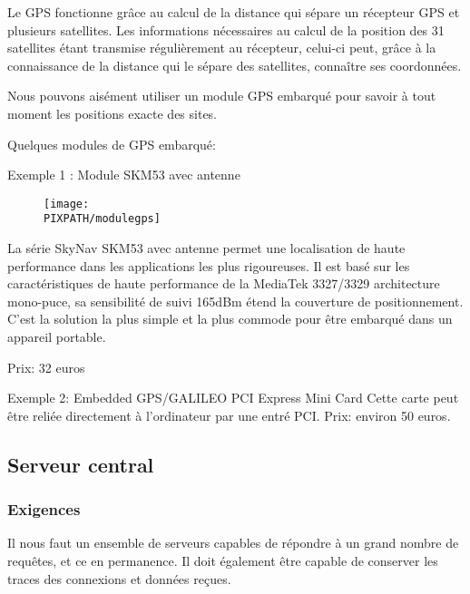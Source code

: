 Le GPS fonctionne grâce au calcul de la distance qui sépare un récepteur GPS et plusieurs satellites. Les informations nécessaires au calcul de la position des 31 satellites étant transmise régulièrement au récepteur, celui-ci peut, grâce à la connaissance de la distance qui le sépare des satellites, connaître ses coordonnées.

Nous pouvons aisément utiliser un module GPS embarqué pour savoir à tout moment les positions exacte des sites.

Quelques modules de GPS embarqué:
\begin{description}
\item Exemple 1 : Module SKM53 avec antenne

    \begin{figure}[!h]
    \begin{center}
    \texttt{[image: \\PIXPATH/modulegps]}
    \caption{}
    \end{center}
    \end{figure}
La série SkyNav SKM53 avec antenne permet une localisation de haute performance dans les applications les plus rigoureuses.
Il est basé sur les caractéristiques de haute performance de la MediaTek 3327/3329 architecture mono-puce, sa sensibilité de suivi 165dBm étend la couverture de positionnement. C'est la solution la plus simple et la plus commode pour être embarqué dans un appareil portable.

Prix: 32 euros

\item Exemple 2: Embedded GPS/GALILEO PCI Express Mini Card
Cette carte peut être reliée directement à l'ordinateur par une entré PCI.
Prix: environ 50 euros.
\end{description}
\subsection{Serveur central}

    \subsubsection{Exigences}
    Il nous faut un ensemble de serveurs capables de répondre à un grand
    nombre de requêtes, et ce en permanence. Il doit également être capable
    de conserver les traces des connexions et données reçues.

